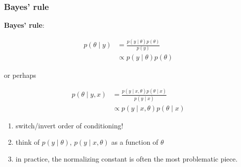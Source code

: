 \documentclass{beamer}
\begin{document}
\begin{frame}
\frametitle{Bayes' rule}

{\bf Bayes' rule}:

\begin{align*}
p(\theta \mid y) &= \frac{p(y \mid \theta) p(\theta)}{p(y)}\\
&\propto p(y \mid \theta) p(\theta)
\end{align*}
\pause

or perhaps

\begin{align*}
p(\theta \mid y, x) &= \frac{p(y \mid x, \theta) p(\theta \mid x)}{p(y \mid x)}\\
&\propto p(y \mid x, \theta) p(\theta \mid x)
\end{align*}
\pause

\begin{enumerate}
\item switch/invert order of conditioning!
\item think of $p(y \mid \theta)$, $p(y \mid x, \theta)$ as a function of $\theta$
\item in practice, the normalizing constant is often the most problematic piece.
\end{enumerate}

\end{frame}

\end{document}
